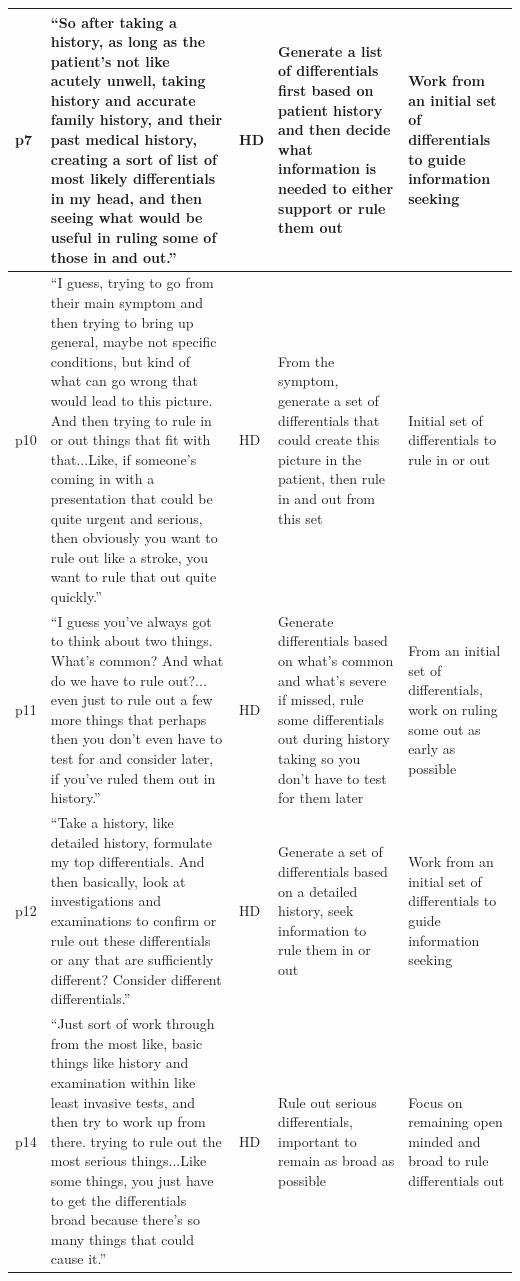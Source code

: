 \documentclass[a4paper, nobind]{templates/ociamthesis}
\begin{document}
\begin{longtable}{>{\raggedright\arraybackslash}p{5em}|>{\raggedright\arraybackslash}p{14em}|>{\raggedright\arraybackslash}p{3em}|>{\raggedright\arraybackslash}p{6em}|>{\raggedright\arraybackslash}p{6em}}
\hline
p7 & “So after taking a history, as long as the patient's not like acutely unwell, taking history and accurate family history, and their past medical history, creating a sort of list of most likely differentials in my head, and then seeing what would be useful in ruling some of those in and out.” & HD & Generate a list of differentials first based on patient history and then decide what information is needed to either support or rule them out & Work from an initial set of differentials to guide information seeking\\
\hline
p10 & “I guess, trying to go from their main symptom and then trying to bring up general, maybe not specific conditions, but kind of what can go wrong that would lead to this picture. And then trying to rule in or out things that fit with that...Like, if someone's coming in with a presentation that could be quite urgent and serious, then obviously you want to rule out like a stroke, you want to rule that out quite quickly.” & HD & From the symptom, generate a set of differentials that could create this picture in the patient, then rule in and out from this set & Initial set of differentials to rule in or out\\
\hline
p11 & “I guess you've always got to think about two things. What's common? And what do we have to rule out?... even just to rule out a few more things that perhaps then you don't even have to test for and consider later, if you've ruled them out in history.” & HD & Generate differentials based on what's common and what's severe if missed, rule some differentials out during history taking so you don't have to test for them later & From an initial set of differentials, work on ruling some out as early as possible\\
\hline
p12 & “Take a history, like detailed history, formulate my top differentials. And then basically, look at investigations and examinations to confirm or rule out these differentials or any that are sufficiently different? Consider different differentials.” & HD & Generate a set of differentials based on a detailed history, seek information to rule them in or out & Work from an initial set of differentials to guide information seeking\\
\hline
p14 & “Just sort of work through from the most like, basic things like history and examination within like least invasive tests, and then try to work up from there. trying to rule out the most serious things...Like some things, you just have to get the differentials broad because there's so many things that could cause it.” & HD & Rule out serious differentials, important to remain as broad as possible & Focus on remaining open minded and broad to rule differentials out\\

\end{longtable}
\end{document}
